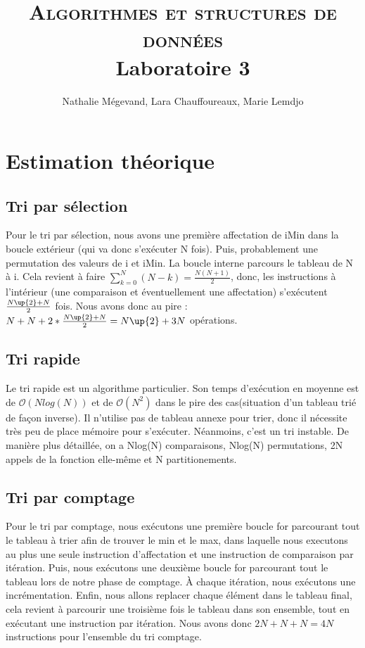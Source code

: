 \documentclass[11pt]{article}
\title{\vspace{-8mm}\textsc{\huge Algorithmes et structures de données}\\ 
 \large{ Laboratoire 3\\}
\vspace{-1 em}
}
\author{Nathalie Mégevand, Lara Chauffoureaux, Marie Lemdjo}
\begin{document}
\maketitle
\thispagestyle{fancy}



\section*{Estimation théorique}

\subsection*{Tri par sélection}
Pour le tri par sélection, nous avons une première affectation de iMin dans la boucle extérieur (qui va donc s'exécuter N fois). Puis, probablement une permutation des valeurs de i et iMin.
La boucle interne parcours le tableau de N à i. Cela revient à faire $ \sum^{N}_{k = 0}{(N-k)} = \frac{N(N+1)}{2} $, donc, les instructions à l'intérieur (une comparaison et éventuellement une affectation) s'exécutent $ \frac{N\up{2} + N}{2} $ fois. Nous avons donc au pire : $ N + N + 2*\frac{N\up{2} + N}{2} = N\up{2} + 3N $ opérations.

\subsection*{Tri rapide}

Le tri rapide est un algorithme particulier. Son temps d'exécution en moyenne est de $\mathcal{O}(Nlog(N))$ et de $\mathcal{O}(N^2)$ dans le pire des cas(situation d'un tableau trié de façon  inverse). Il n'utilise pas de tableau annexe pour trier, donc il nécessite très peu de place mémoire pour s'exécuter. Néanmoins, c'est un tri instable. De manière plus détaillée, on a Nlog(N) comparaisons, Nlog(N) permutations, 2N appels de la fonction elle-même et N partitionements.


\subsection*{Tri par comptage}

Pour le tri par comptage, nous exécutons une première boucle for parcourant tout le tableau à trier afin de trouver le min et le max, dans laquelle nous executons au plus une seule instruction d'affectation et une instruction de comparaison par itération. Puis, nous exécutons une deuxième boucle for parcourant tout le tableau lors de notre phase de comptage. À chaque itération, nous exécutons une incrémentation. Enfin, nous allons replacer chaque élément dans le tableau final, cela revient à parcourir une troisième fois le tableau dans son ensemble, tout en exécutant une instruction par itération. Nous avons donc $2N + N + N = 4N$ instructions pour l'ensemble du tri comptage.
\end{document}
